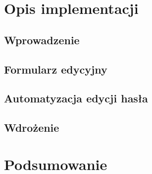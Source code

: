 \documentclass{pracamgr}
\begin{document}
\chapter{Opis implementacji}
\label{chap:impl}
\section{Wprowadzenie}
\section{Formularz edycyjny}
\section{Automatyzacja edycji hasła}
\section{Wdrożenie}

\chapter{Podsumowanie}


\end{document}
